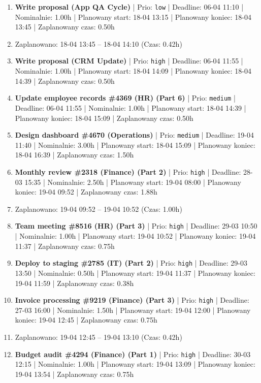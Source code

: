 {\begin{enumerate}
  \item [\textbf{14695}] \textbf{Write proposal (App QA Cycle)} | Prio: \texttt{low} | Deadline: 06-04 11:10 | Nominalnie: 1.00h | Planowany start: 18-04 13:15 | Planowany koniec: 18-04 13:45 | Zaplanowany czas: 0.50h
  \item [\textbf{PRZERWA}] Zaplanowano: 18-04 13:45 -- 18-04 14:10 (Czas: 0.42h)
  \item [\textbf{14629}] \textbf{Write proposal (CRM Update)} | Prio: \texttt{high} | Deadline: 06-04 11:55 | Nominalnie: 1.00h | Planowany start: 18-04 14:09 | Planowany koniec: 18-04 14:39 | Zaplanowany czas: 0.50h
  \item [\textbf{14658}] \textbf{Update employee records \#4369 (HR) (Part 6)} | Prio: \texttt{medium} | Deadline: 06-04 11:55 | Nominalnie: 1.00h | Planowany start: 18-04 14:39 | Planowany koniec: 18-04 15:09 | Zaplanowany czas: 0.50h
  \item [\textbf{14676}] \textbf{Design dashboard \#4670 (Operations)} | Prio: \texttt{medium} | Deadline: 19-04 11:40 | Nominalnie: 3.00h | Planowany start: 18-04 15:09 | Planowany koniec: 18-04 16:39 | Zaplanowany czas: 1.50h
  \item [\textbf{14618}] \textbf{Monthly review \#2318 (Finance) (Part 2)} | Prio: \texttt{high} | Deadline: 28-03 15:35 | Nominalnie: 2.50h | Planowany start: 19-04 08:00 | Planowany koniec: 19-04 09:52 | Zaplanowany czas: 1.88h
  \item [\textbf{PRZERWA}] Zaplanowano: 19-04 09:52 -- 19-04 10:52 (Czas: 1.00h)
  \item [\textbf{14624}] \textbf{Team meeting \#8516 (HR) (Part 3)} | Prio: \texttt{high} | Deadline: 29-03 10:50 | Nominalnie: 1.00h | Planowany start: 19-04 10:52 | Planowany koniec: 19-04 11:37 | Zaplanowany czas: 0.75h
  \item [\textbf{14623}] \textbf{Deploy to staging \#2785 (IT) (Part 2)} | Prio: \texttt{high} | Deadline: 29-03 13:50 | Nominalnie: 0.50h | Planowany start: 19-04 11:37 | Planowany koniec: 19-04 11:59 | Zaplanowany czas: 0.38h
  \item [\textbf{14622}] \textbf{Invoice processing \#9219 (Finance) (Part 3)} | Prio: \texttt{high} | Deadline: 27-03 16:00 | Nominalnie: 1.50h | Planowany start: 19-04 12:00 | Planowany koniec: 19-04 12:45 | Zaplanowany czas: 0.75h
  \item [\textbf{PRZERWA}] Zaplanowano: 19-04 12:45 -- 19-04 13:10 (Czas: 0.42h)
  \item [\textbf{14619}] \textbf{Budget audit \#4294 (Finance) (Part 1)} | Prio: \texttt{high} | Deadline: 30-03 12:15 | Nominalnie: 1.00h | Planowany start: 19-04 13:09 | Planowany koniec: 19-04 13:54 | Zaplanowany czas: 0.75h

\end{enumerate}}
